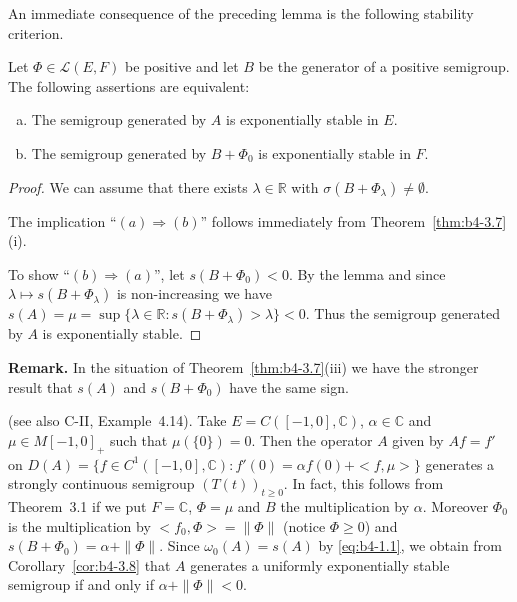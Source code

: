 An immediate consequence of the preceding lemma is the following stability criterion.

\begin{corollary}\label{cor:b4-3.8}
Let $\Phi \in \mathcal{L}(E,F)$ be positive and let $B$ be the generator of a positive semigroup. 
The following assertions are equivalent:

\begin{enumerate}[(a)]
	\item The semigroup generated by $A$ is exponentially stable in $E$.
	\item The semigroup generated by $B + \Phi_{0}$ is exponentially stable in $F$.
\end{enumerate}
\end{corollary}

\begin{proof}
We can assume that there exists $\lambda \in \mathbb{R}$ with $\sigma(B+\Phi_{\lambda}) \neq \emptyset$.

The implication \enquote{$(a)\Rightarrow(b)$} follows immediately from Theorem~\ref{thm:b4-3.7}(i).

To show \enquote{$(b)\Rightarrow(a)$}, let $s(B+\Phi_{0}) < 0$. 
By the lemma and since $\lambda \mapsto s(B+\Phi_{\lambda})$ is non-increasing we have $s(A) = \mu = \sup\{\lambda \in \mathbb{R} \colon s(B+\Phi_{\lambda}) > \lambda\} < 0$. 
Thus the semigroup generated by $A$ is exponentially stable.
\end{proof}

\medskip\noindent
\textbf{Remark.}\quad
In the situation of Theorem~\ref{thm:b4-3.7}(iii) we have the stronger result that $s(A)$ and $s(B + \Phi_{0})$ have the same sign.

\begin{example}\label{ex:b4-3.9}
(see also C-II, Example~4.14). Take $E = C([-1,0],\mathbb{C})$, $\alpha \in \mathbb{C}$ and $\mu \in M[-1,0]_{+}$ such that $\mu(\{0\}) = 0$. 
Then the operator $A$ given by $Af = f'$ on $D(A) = \{f \in C^1([-1,0],\mathbb{C}) \colon f'(0) = \alpha f(0) + <f,\mu>\}$ generates a strongly continuous semigroup $(T(t))_{t\geq0}$. 
In fact, this follows from Theorem~3.1 if we put $F = \mathbb{C}$, $\Phi = \mu$ and $B$ the multiplication by $\alpha$. 
Moreover $\Phi_{0}$ is the multiplication by $<f_{0},\Phi> = \|\Phi\|$ (notice $\Phi\geq0$) and $s(B + \Phi_{0}) = \alpha + \|\Phi\|$. 
Since $\omega_{0}(A) = s(A)$ by \eqref{eq:b4-1.1}, we obtain from Corollary~\ref{cor:b4-3.8} that $A$ generates a uniformly exponentially stable semigroup if and only if $\alpha + \|\Phi\| < 0$.
\end{example}
%
%

